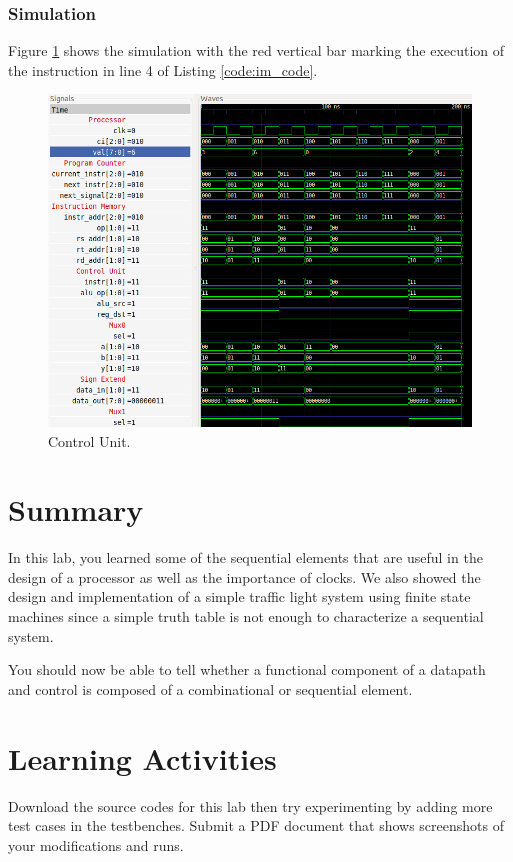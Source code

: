 \documentclass[a4paper, 11pt,oneside]{article}
\begin{document}
\subsubsection{Simulation}
Figure \ref{fig:sim} shows the simulation with the red vertical bar marking the 
execution of the instruction in line 4 of Listing \ref{code:im_code}.

\begin{figure}[H]
	\begin{center}
	\includegraphics[width=6in]{sim.png}
	\caption{Control Unit.}
	\label{fig:sim} 
	\end{center}
\end{figure}


\section{Summary}
In this lab, you learned some of the sequential elements that are useful in the 
design of a processor as well as the importance of clocks. We also showed the
design and implementation of a simple traffic light system using finite state 
machines since a simple truth table is not enough to characterize a sequential 
system. 

You should now be able to tell whether a functional component of a datapath and 
control is composed of a combinational or sequential element.

\section{Learning Activities}
Download the source codes for this lab then try experimenting by adding more 
test cases in the testbenches. Submit a PDF document that shows screenshots of 
your modifications and runs. 
\end{document}
